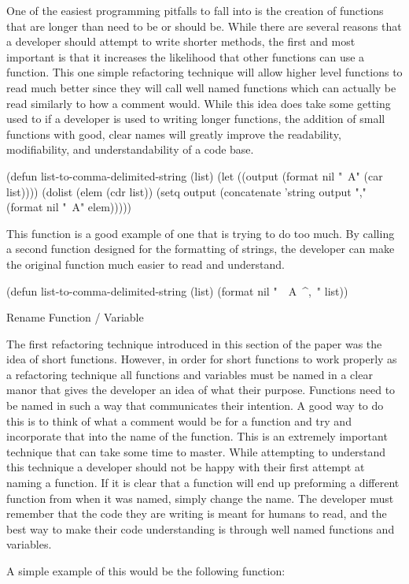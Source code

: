 \documentclass{article}
\begin{document}
One of the easiest programming pitfalls to fall into is the creation of functions that are longer than need to be or should be. While there are several reasons that a developer should attempt to write shorter methods, the first and most important is that it increases the likelihood that other functions can use a function. This one simple refactoring technique will allow higher level functions to read much better since they will call well named functions which can actually be read similarly to how a comment would. While this idea does take some getting used to if a developer is used to writing longer functions, the addition of small functions with good, clear names will greatly improve the readability, modifiability, and understandability of a code base. 

(defun list-to-comma-delimited-string (list)
  (let ((output (format nil "~A" (car list))))
    (dolist (elem (cdr list))
      (setq output (concatenate 'string output "," (format nil "~A" elem)))))

This function is a good example of one that is trying to do too much. By calling a second function designed for the formatting of strings, the developer can make the original function much easier to read and understand.

(defun list-to-comma-delimited-string (list)
  (format nil "~{~A~^,~}" list))


Rename Function / Variable

The first refactoring technique introduced in this section of the paper was the idea of short functions. However, in order for short functions to work properly as a refactoring technique all functions and variables must be named in a clear manor that gives the developer an idea of what their purpose. Functions need to be named in such a way that communicates their intention. A good way to do this is to think of what a comment would be for a function and try and incorporate that into the name of the function. This is an extremely important technique that can take some time to master. While attempting to understand this technique a developer should not be happy with their first attempt at naming a function. If it is clear that a function will end up preforming a different function from when it was named, simply change the name. The developer must remember that the code they are writing is meant for humans to read, and the best way to make their code understanding is through well named functions and variables. 

A simple example of this would be the following function:
\end{document}
